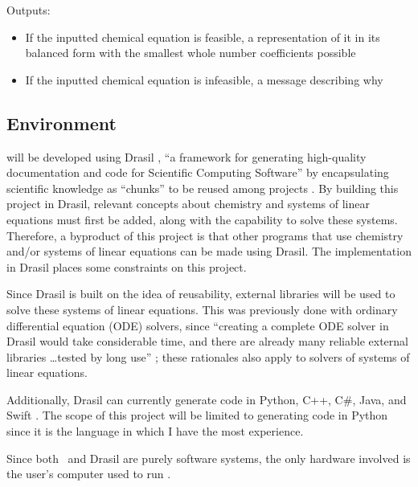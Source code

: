 \documentclass{article}
\begin{document}
\noindent Outputs:

\begin{itemize}
	\item If the inputted chemical equation is feasible, a representation of it
	      in its balanced form with the smallest whole number coefficients
	      possible
	\item If the inputted chemical equation is infeasible, a message
	      describing why
\end{itemize}

\subsection{Environment} \label{env}

\progname{} will be developed using Drasil
\cite{carette_drasil_2021}, ``a framework for generating
high-quality documentation and code for Scientific Computing Software''
\cite[p. iii]{maclachlan_design_2020} by encapsulating scientific knowledge as
``chunks'' to be reused among projects \cite{maclachlan_design_2020}. By
building this project in Drasil, relevant concepts about chemistry and systems
of linear equations must first be added, along with the capability to solve
these systems. Therefore, a byproduct of this project is that other programs
that use chemistry and/or systems of linear equations can be made using
Drasil. The implementation in Drasil places some constraints on this project.

Since Drasil is built on the idea of reusability, external libraries will be
used to solve these systems of linear equations. This was previously done with
ordinary differential equation (ODE) solvers, since ``creating a complete ODE
solver in Drasil would take considerable time, and there are already many
reliable external libraries \dots tested by long use''
\cite[p. 24]{chen_solving_2022}; these rationales also apply to solvers of
systems of linear equations.

Additionally, Drasil can currently generate code in Python, C++, C\#, Java, and
Swift \cite{chen_solving_2022}. The scope of this project will be limited to
generating code in Python since it is the language in which I
have the most experience.

Since both \progname~and Drasil are purely software systems, the only
hardware involved is the user's computer used to run \progname{}.
\end{document}
